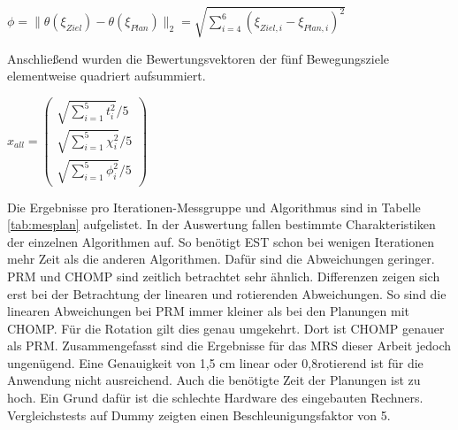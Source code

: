 \begin{math}
	\phi = \|\theta(\xi_{Ziel}) - \theta(\xi_{Plan})\|_2 = \sqrt{\sum_{i=4}^{6}(\xi_{Ziel,i}-\xi_{Plan,i})^2}
\end{math}

Anschließend wurden die Bewertungsvektoren der fünf Bewegungsziele elementweise quadriert aufsummiert.

\begin{math}
	x_{all} = \left(\begin{array}{c}
				\sqrt{\sum_{i=1}^{5} t_i^2}/5\\ 
				\sqrt{\sum_{i=1}^{5} \chi_i^2}/5 \\
				\sqrt{\sum_{i=1}^{5} \phi_i^2}/5 \end{array}\right)	
\end{math}


Die Ergebnisse pro Iterationen-Messgruppe und Algorithmus sind in Tabelle \ref{tab:mesplan} aufgelistet. In der Auswertung fallen bestimmte Charakteristiken der einzelnen Algorithmen auf. So benötigt EST schon bei wenigen Iterationen mehr Zeit als die anderen Algorithmen. Dafür sind die Abweichungen geringer. PRM und CHOMP sind zeitlich betrachtet sehr ähnlich. Differenzen zeigen sich erst bei der Betrachtung der linearen und rotierenden Abweichungen. So sind die linearen Abweichungen bei PRM immer kleiner als bei den Planungen mit CHOMP. Für die Rotation gilt dies genau umgekehrt. Dort ist CHOMP genauer als PRM. Zusammengefasst sind die Ergebnisse für das MRS dieser Arbeit jedoch ungenügend. Eine Genauigkeit von 1,5 cm linear oder 0,8\textdegree{ }rotierend  ist für die Anwendung nicht ausreichend. Auch die benötigte Zeit der Planungen ist zu hoch. Ein Grund dafür ist die schlechte Hardware des eingebauten Rechners. Vergleichstests auf Dummy zeigten einen Beschleunigungsfaktor von 5.


